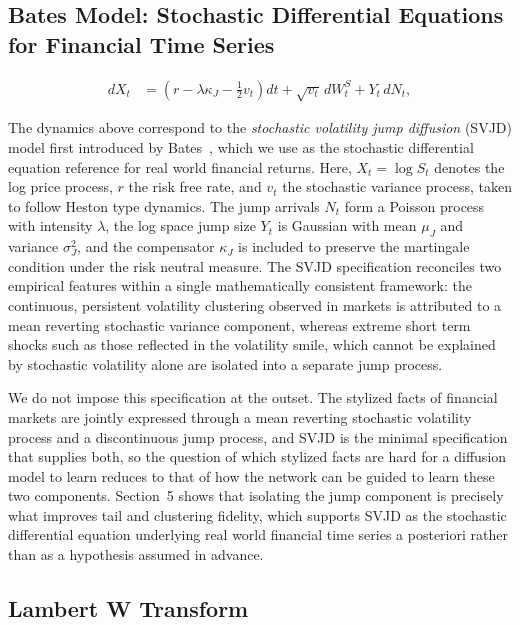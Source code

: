 \documentclass[sigconf,natbib=false]{acmart}
\begin{document}
\subsection{Bates Model: Stochastic Differential Equations for Financial Time Series}

\begin{align}
dX_t
&=
\left(
r - \lambda \kappa_J - \frac{1}{2}v_t
\right)dt
+
\sqrt{v_t}\,dW_t^S
+
Y_t\,dN_t,
\end{align}

The dynamics above correspond to the \emph{stochastic volatility jump diffusion} (SVJD) model first introduced by Bates~\cite{bates1996jumps}, which we use as the stochastic differential equation reference for real world financial returns. Here, $X_t = \log S_t$ denotes the log price process, $r$ the risk free rate, and $v_t$ the stochastic variance process, taken to follow Heston type dynamics. The jump arrivals $N_t$ form a Poisson process with intensity $\lambda$, the log space jump size $Y_t$ is Gaussian with mean $\mu_J$ and variance $\sigma_J^2$, and the compensator $\kappa_J$ is included to preserve the martingale condition under the risk neutral measure. The SVJD specification reconciles two empirical features within a single mathematically consistent framework: the continuous, persistent volatility clustering observed in markets is attributed to a mean reverting stochastic variance component, whereas extreme short term shocks such as those reflected in the volatility smile, which cannot be explained by stochastic volatility alone are isolated into a separate jump process.

We do not impose this specification at the outset. The stylized facts of financial markets are jointly expressed through a mean reverting stochastic volatility process and a discontinuous jump process, and SVJD is the minimal specification that supplies both, so the question of which stylized facts are hard for a diffusion model to learn reduces to that of how the network can be guided to learn these two components. Section~5 shows that isolating the jump component is precisely what improves tail and clustering fidelity, which supports SVJD as the stochastic differential equation underlying real world financial time series a posteriori rather than as a hypothesis assumed in advance.


\subsection{Lambert W Transform}
\end{document}
